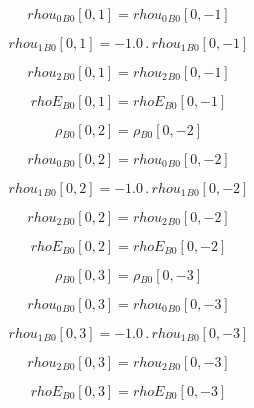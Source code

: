 \documentclass{article}
\begin{document}
\begin{dmath}{rhou_{0}{_{B0}}}[{0,1}] = {rhou_{0}{_{B0}}}[{0,-1}]\end{dmath}

\begin{dmath}{rhou_{1}{_{B0}}}[{0,1}] = - 1.0 \,.\, {rhou_{1}{_{B0}}}[{0,-1}]\end{dmath}

\begin{dmath}{rhou_{2}{_{B0}}}[{0,1}] = {rhou_{2}{_{B0}}}[{0,-1}]\end{dmath}

\begin{dmath}{rhoE{_{B0}}}[{0,1}] = {rhoE{_{B0}}}[{0,-1}]\end{dmath}

\begin{dmath}{\rho{_{B0}}}[{0,2}] = {\rho{_{B0}}}[{0,-2}]\end{dmath}

\begin{dmath}{rhou_{0}{_{B0}}}[{0,2}] = {rhou_{0}{_{B0}}}[{0,-2}]\end{dmath}

\begin{dmath}{rhou_{1}{_{B0}}}[{0,2}] = - 1.0 \,.\, {rhou_{1}{_{B0}}}[{0,-2}]\end{dmath}

\begin{dmath}{rhou_{2}{_{B0}}}[{0,2}] = {rhou_{2}{_{B0}}}[{0,-2}]\end{dmath}

\begin{dmath}{rhoE{_{B0}}}[{0,2}] = {rhoE{_{B0}}}[{0,-2}]\end{dmath}

\begin{dmath}{\rho{_{B0}}}[{0,3}] = {\rho{_{B0}}}[{0,-3}]\end{dmath}

\begin{dmath}{rhou_{0}{_{B0}}}[{0,3}] = {rhou_{0}{_{B0}}}[{0,-3}]\end{dmath}

\begin{dmath}{rhou_{1}{_{B0}}}[{0,3}] = - 1.0 \,.\, {rhou_{1}{_{B0}}}[{0,-3}]\end{dmath}

\begin{dmath}{rhou_{2}{_{B0}}}[{0,3}] = {rhou_{2}{_{B0}}}[{0,-3}]\end{dmath}

\begin{dmath}{rhoE{_{B0}}}[{0,3}] = {rhoE{_{B0}}}[{0,-3}]\end{dmath}
\end{document}
